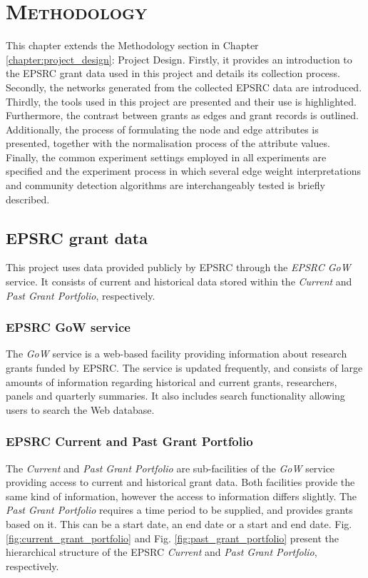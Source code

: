 \chapter{\textsc{Methodology}}
\label{chapter:methodology}

This chapter extends the Methodology section in Chapter \ref{chapter:project_design}: Project Design. Firstly, it provides an introduction to the EPSRC grant data used in this project and details its collection process. Secondly, the networks generated from the collected EPSRC data are introduced. Thirdly, the tools used in this project are presented and their use is highlighted. Furthermore, the contrast between grants as edges and grant records is outlined. Additionally, the process of formulating the node and edge attributes is presented, together with the normalisation process of the attribute values. Finally, the common experiment settings employed in all experiments are specified and the experiment process in which several edge weight interpretations and community detection algorithms are interchangeably tested is briefly described.

\section{EPSRC grant data}

This project uses data provided publicly by EPSRC through the \textit{EPSRC GoW} service. It consists of current and historical data stored within the \textit{Current} and \textit{Past Grant Portfolio}, respectively.

\subsection{EPSRC GoW service}

The \textit{GoW} service is a web-based facility providing information about research grants funded by EPSRC. The service is updated frequently, and consists of large amounts of information regarding historical and current grants, researchers, panels and quarterly summaries. It also includes search functionality allowing users to search the Web database.

\subsection{EPSRC Current and Past Grant Portfolio}

The \textit{Current} and \textit{Past Grant Portfolio} are sub-facilities of the \textit{GoW} service providing access to current and historical grant data. Both facilities provide the same kind of information, however the access to information differs slightly. The \textit{Past Grant Portfolio} requires a time period to be supplied, and provides grants based on it. This can be a start date, an end date or a start and end date. Fig. \ref{fig:current_grant_portfolio} and Fig. \ref{fig:past_grant_portfolio} present the hierarchical structure of the EPSRC \textit{Current} and \textit{Past Grant Portfolio}, respectively.

